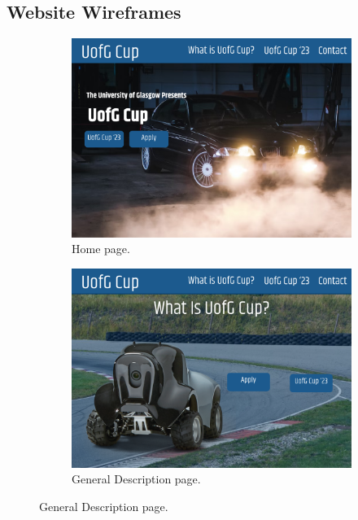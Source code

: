 \documentclass{l4proj}
\begin{document}
\begin{appendices}
\section{Website Wireframes}
\begin{figure}
    \begin{subfigure}{0.49\textwidth}
        \centering
        \includegraphics[width=\textwidth]{images/Home.pdf}
        \caption{Home page.}
        \label{fig:web-home-page}  
    \end{subfigure}
    \begin{subfigure}{0.49\textwidth}
        \centering
        \includegraphics[width=\textwidth]{images/What is UofG Cup_.pdf}
        \caption{General Description page.}
        \label{fig:web-gen-desc-page}  
    \end{subfigure}
    

\end{figure}
\end{appendices}
\end{document}
